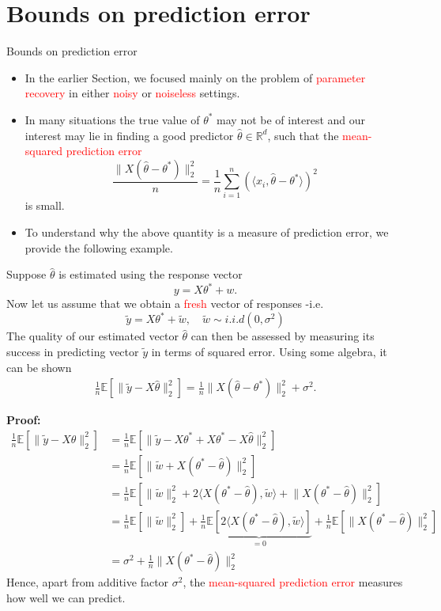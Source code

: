 \documentclass[10pt,handout,english]{beamer}
\newcommand{\E}{\mathbb{E}}
\newcommand{\R}{\mathbb{R}}
\begin{document}
\section{Bounds on prediction error}
\begin{frame}[allowframebreaks]{Bounds on prediction error}
\begin{itemize}
\item In the earlier Section, we focused mainly on the problem of \textcolor{red}{parameter recovery} in either \textcolor{red}{noisy} or \textcolor{red}{noiseless} settings.

\item In many situations the true value of $\theta^*$ may not be of interest and our interest may lie in finding a good predictor $\hat{\theta}\in\R^d$, such that the \textcolor{red}{mean-squared prediction error}
\[
\frac{\lVert X(\hat{\theta}-\theta^*)\rVert_2^2}{n}=\frac{1}{n}\sum\limits_{i=1}^n\left(\langle x_i,\hat{\theta}-\theta^*\rangle\right)^2
\]
is small.
\item To understand why the above quantity is a measure of prediction error, we provide the following example.
\end{itemize}
Suppose $\hat{\theta}$ is estimated  using the response vector 
\[
y=X\theta^*+w.
\]
Now let us assume that we obtain a \textcolor{red}{fresh} vector of responses -i.e.
\[
\tilde{y}=X\theta^*+\tilde{w},\quad\tilde{w}\sim i.i.d(0,\sigma^2) 
\]
The quality of our estimated vector $\hat{\theta}$ can then be assessed by measuring its success in predicting vector $\tilde{y}$ in terms of squared error. Using some algebra, it can be shown
\begin{align*}
\frac{1}{n}\E[\lVert\tilde{y}-X\hat{\theta}\rVert_2^2]=\frac{1}{n}\lVert X(\hat{\theta}-\theta^*) \rVert_2^2+\sigma^2.
\end{align*}

\noindent\textbf{Proof:}
\begin{align*}
\frac{1}{n}\E[\lVert\tilde{y}-X\hat{\theta}\rVert_2^2]&=\frac{1}{n}\E[\lVert\tilde{y}-X\theta^*+X\theta^*-X\hat{\theta}\rVert_2^2]\\
&=\frac{1}{n}\E[\lVert\tilde{w}+X(\theta^*-\hat{\theta})\rVert_2^2]\\
&=\frac{1}{n}\E[\lVert\tilde{w}\rVert_2^2+2\langle X(\theta^*-\hat{\theta}),\tilde{w} \rangle+\lVert X(\theta^*-\hat{\theta})\rVert_2^2]\\
&=\frac{1}{n}\E[\lVert\tilde{w}\rVert_2^2]+\frac{1}{n}\underbrace{\E[2\langle X(\theta^*-\hat{\theta}),\tilde{w} \rangle]}_{=0}+\frac{1}{n}\E[\lVert X(\theta^*-\hat{\theta})\rVert_2^2]\\
&=\sigma^2+\frac{1}{n}\lVert X(\theta^*-\hat{\theta})\rVert_2^2
\end{align*}
Hence, apart from additive factor $\sigma^2$, the \textcolor{red}{mean-squared prediction error} measures how well we can predict.


\end{frame}
\end{document}
